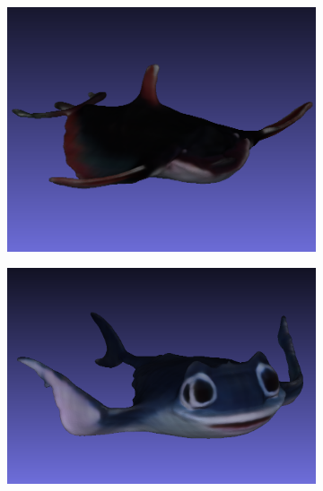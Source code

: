 \begin{figure}[H]
    \centering
    \small
    \begin{subfigure}[b]{0.23\textwidth}
        \centering
        \includegraphics[width=\textwidth]{etc/Genie/manta_coarse_1.png}
        \caption{}
    \end{subfigure}
    \begin{subfigure}[b]{0.26\textwidth}
        \centering
        \includegraphics[width=\textwidth]{etc/Genie/manta_coarse_2.png}
        \caption{}
    \end{subfigure}
    \begin{subfigure}[b]{0.1825\textwidth}
        \centering

\end{subfigure}
\end{figure}
